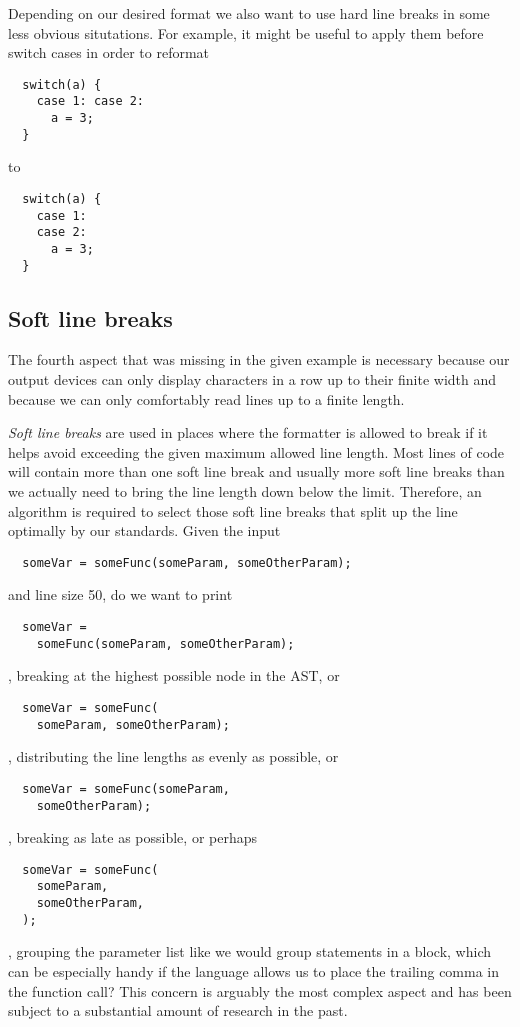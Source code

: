 Depending on our desired format we also want to use hard line breaks in some less obvious situtations.
For example, it might be useful to apply them before switch cases in order to reformat
\begin{verbatim}
  switch(a) {
    case 1: case 2:
      a = 3;
  }
\end{verbatim}
to
\begin{verbatim}
  switch(a) {
    case 1:
    case 2:
      a = 3;
  }
\end{verbatim}

\subsection{Soft line breaks}
The fourth aspect that was missing in the given example is necessary
because our output devices can only display characters in a row up to their finite width and
because we can only comfortably read lines up to a finite length.

\textit{Soft line breaks} are used in places where the formatter is allowed to break
if it helps avoid exceeding the given maximum allowed line length.
Most lines of code will contain more than one soft line break and usually more soft line breaks
than we actually need to bring the line length down below the limit.
Therefore, an algorithm is required to select those soft line breaks
that split up the line optimally by our standards.
Given the input
\begin{verbatim}
  someVar = someFunc(someParam, someOtherParam);
\end{verbatim}
and line size 50, do we want to print
\begin{verbatim}
  someVar =
    someFunc(someParam, someOtherParam);
\end{verbatim}
, breaking at the highest possible node in the AST, or
\begin{verbatim}
  someVar = someFunc(
    someParam, someOtherParam);
\end{verbatim}
, distributing the line lengths as evenly as possible, or
\begin{verbatim}
  someVar = someFunc(someParam,
    someOtherParam);
\end{verbatim}
, breaking as late as possible, or perhaps
\begin{verbatim}
  someVar = someFunc(
    someParam,
    someOtherParam,
  );
\end{verbatim}
, grouping the parameter list like we would group statements in a block,
which can be especially handy if the language allows us to place the trailing comma in the function call?
This concern is arguably the most complex aspect and has been subject to a substantial amount of research in the past.
\autocite{designPrettyPrintingLib}\autocite{prettierPrinter}

